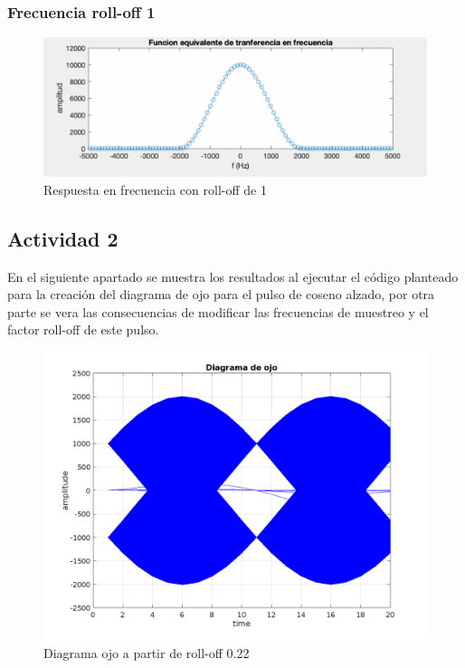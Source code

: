 \subsubsection{Frecuencia roll-off 1} \phantom{text}

\begin{figure}[H]
    \centering
    \includegraphics[scale=0.4]{Imagenes/act 2/rolloff1frec.pdf}
    \caption{Respuesta en  frecuencia  con roll-off de 1}
    \label{fig:Respuesta en  frecuencia  con roll-off de 1}
\end{figure}


\subsection{Actividad 2}


En el siguiente apartado se muestra los resultados al ejecutar el código planteado para la creación  del diagrama de ojo para el pulso de coseno alzado, por otra parte se vera las consecuencias de modificar las frecuencias de muestreo y el factor roll-off de este pulso.



\vspace*{-0.5cm}
\begin{figure}[H]
    \centering
    \includegraphics[scale=0.4]{Imagenes/DiagramaOjo/Figure_1rollOff022.pdf}
    \caption{Diagrama ojo a partir de roll-off 0.22}
    \label{fig:Diagrama ojo awgn}
\end{figure}


